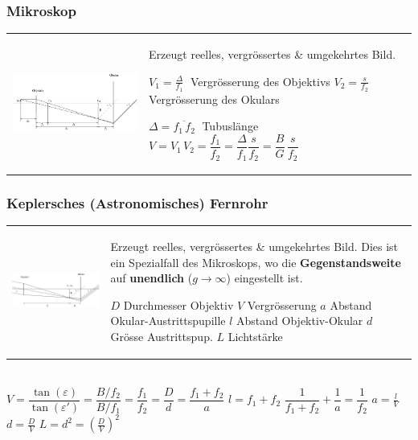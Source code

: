 \subsubsection{Mikroskop  }
\begin{tabular}{ll}
  \parbox{8cm}{
    \includegraphics[width=8cm]{./bilder/mikroskop.png}} &
  \parbox{10cm}{
    Erzeugt reelles, vergrössertes \& umgekehrtes Bild. \\
    \\
    $V_1 = \frac{\Delta}{f_1} \;$ Vergrösserung des Objektivs\\
    $V_2 = \frac{s}{f_2} \;$ Vergrösserung des Okulars \\
    \\
    $\Delta = \overline{f_1\,f_2} \;$ Tubuslänge \\
    $V=V_1\,V_2= \dfrac{f_1}{f_2} = \dfrac{\Delta}{f_1} \dfrac{s}{f_2} =
    \dfrac{B}{G} \, \dfrac{s}{f_2}$ }
\end{tabular}

\subsubsection{Keplersches (Astronomisches) Fernrohr  }
\begin{tabular}{ll}
  \parbox{11cm}{
    \includegraphics[width=10cm]{./bilder/astron.png}} &
  \parbox{7cm}{
    Erzeugt reelles, vergrössertes \& umgekehrtes Bild. Dies ist ein Spezialfall
    des Mikroskops, wo die \textbf{Gegenstandsweite} auf \textbf{unendlich} ($g \rightarrow \infty$) eingestellt ist. \\
    \\
    $D$ Durchmesser Objektiv \\
    $V$ Vergrösserung\\
    $a$ Abstand Okular-Austrittspupille\\
    $l$ Abstand Objektiv-Okular\\
    $d$ Grösse Austrittspup.\\
    $L$ Lichtstärke }
\end{tabular} \\
$V = \dfrac{\tan(\varepsilon)}{\tan(\varepsilon')} = \dfrac{B/f_2}{B/f_1} =
\dfrac{f_1}{f_2} = \dfrac{D}{d} = \dfrac{f_1+f_2}{a}$ \qquad $l = f_1+f_2$
\qquad $\dfrac{1}{f_1+f_2} + \dfrac{1}{a} = \dfrac{1}{f_2}$ \qquad
$a = \frac{l}{V} $ \qquad $d = \frac{D}{V}$ \qquad $L = d^2 = \left( \frac{D}{V}
\right)^2$

